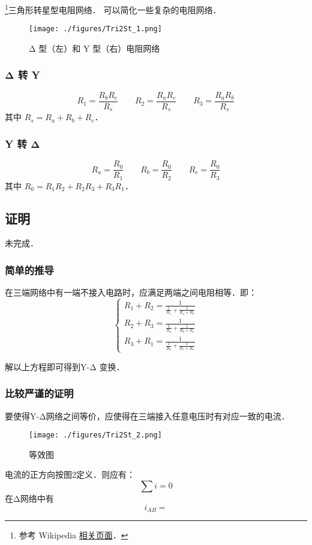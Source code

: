 
\begin{issues}
\issueDraft
\end{issues}

\footnote{参考 Wikipedia \href{https://en.wikipedia.org/wiki/Y-Δ_transform}{相关页面}．}三角形转星型电阻网络． 可以简化一些复杂的电阻网络．

\begin{figure}[ht]
\centering
\texttt{[image: ./figures/Tri2St\_1.png]}
\caption{Δ 型（左）和 Y 型（右）电阻网络} \label{Tri2St_fig1}
\end{figure}

\subsubsection{Δ 转 Y}
\begin{equation}
R_1 = \frac{R_b R_c}{R_s} \qquad
R_2 = \frac{R_a R_c}{R_s} \qquad
R_3 = \frac{R_a R_b}{R_s}
\end{equation}
其中 $R_s = R_a + R_b + R_c$．

\subsubsection{Y 转 Δ}
\begin{equation}
R_a = \frac{R_0}{R_1} \qquad
R_b = \frac{R_0}{R_2} \qquad
R_c = \frac{R_0}{R_3}
\end{equation}
其中 $R_0 = R_1 R_2 + R_2 R_3 + R_3 R_1$．

\subsection{证明}
未完成．
\subsubsection{简单的推导}
在三端网络中有一端不接入电路时，应满足两端之间电阻相等．即：
\begin{equation}
\left\{\begin{matrix}R_1+R_2=\frac{1}{\frac{1}{R_c}+\frac{1}{R_a+R_b}}\\R_2+R_3=\frac{1}{\frac{1}{R_a}+\frac{1}{R_b+R_c}}\\R_3+R_1=\frac{1}{\frac{1}{R_b}+\frac{1}{R_c+R_a}}\end{matrix}\right.
\end{equation}

解以上方程即可得到Y-Δ 变换．
\subsubsection{比较严谨的证明}
要使得Y-Δ网络之间等价，应使得在三端接入任意电压时有对应一致的电流．
\begin{figure}[ht]
\centering
\texttt{[image: ./figures/Tri2St\_2.png]}
\caption{等效图} \label{Tri2St_fig2}
\end{figure}
电流的正方向按图2定义．则应有：
\begin{equation}
\sum{i}=0
\end{equation}
在Δ网络中有
\begin{equation}
i_{AB}=
\end{equation}

